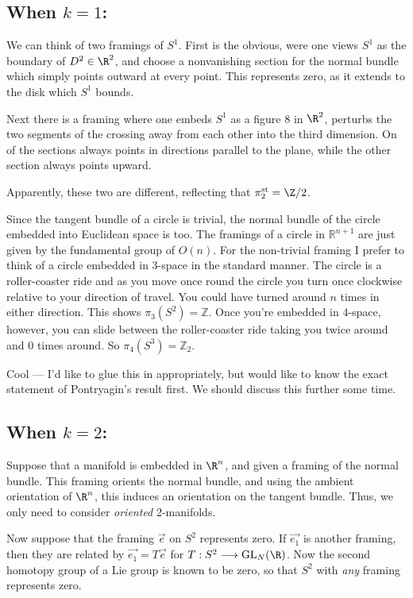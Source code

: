 \documentclass[11pt]{article}
\newcommand{\rednote}[1]{{\color{red}#1}\scalebox{.1}{rednote}}
\newcommand{\bluenote}[1]{{\color{blue}#1}\scalebox{.1}{rednote}}
\begin{document}
\subsection*{When \texorpdfstring{$k=1$}{k=1}:}
We can think of two framings of $S^1$. First is the obvious, were one views
$S^1$ as the boundary of $D^2\in \R^2$, and choose a nonvanishing section for
the normal bundle which simply points outward at every point. This represents
zero, as it extends to the disk which $S^1$ bounds.

Next there is a framing where one embeds $S^1$ as a figure $8$ in $\R^2$,
perturbs the two segments of the crossing away from each other into the third
dimension. On of the sections always points in directions parallel to the plane,
while the other section always points upward.

Apparently, these two are different, reflecting that $\pi_2^\text{st}=\Z/2$.

\bluenote{%
Since the tangent bundle of a circle is trivial, the normal bundle of
the circle embedded into Euclidean space is too. The framings of a circle
in $\mathbb{R}^{n+1}$ are just given by the fundamental group of $O(n)$.
For the non-trivial framing I prefer to think of a circle embedded in
3-space in the standard manner. The circle is a roller-coaster ride and as
you move once round the circle you turn once clockwise relative to your
direction of travel. You could have turned around $n$ times in either
direction. This shows $\pi_3(S^2)=\mathbb{Z}$. Once you're embedded in
$4$-space, however, you can slide between the roller-coaster ride taking
you twice around and $0$ times around. So $\pi_4(S^3)=\mathbb{Z}_2$.}

\rednote{ Cool --- I'd like to glue this in appropriately, but would like to
know the exact statement of Pontryagin's result first. We should discuss this further some time.}

\subsection*{When \texorpdfstring{$k=2$}{k=2}:}
Suppose that a manifold is embedded in $\R^n$, and given a framing of the normal
bundle. This framing orients the normal bundle, and using the ambient
orientation of $\R^n$, this induces an orientation on the tangent bundle. Thus,
we only need to consider \emph{oriented} 2-manifolds.

Now suppose that the framing $\overrightarrow{e}$ on $S^2$ represents zero. If
$\overrightarrow{e_1}$ is another framing, then they are related by
$\overrightarrow{e_1}=T\overrightarrow{e}$ for $T:S^2\to\GL_N(\R)$. Now the
second homotopy group of a Lie group is known to be zero, so that $S^2$ with
\emph{any} framing represents zero.
\end{document}
